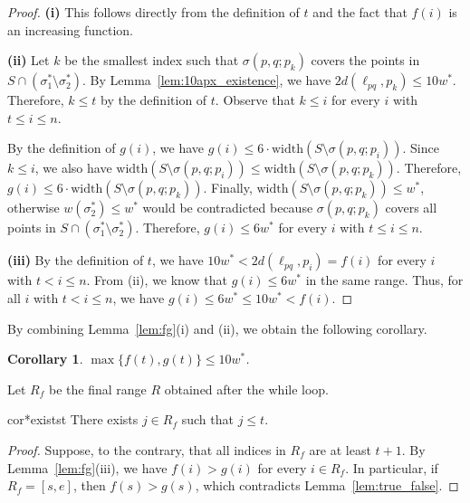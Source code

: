 \documentclass[10pt,a4paper]{article}
\newtheorem{corollary}[theorem]{Corollary}
\theoremstyle{star}
\theoremstyle{claimstar}
\newcommand{\width}{\ensuremath{\mathrm{width}}}
\begin{document}
\begin{proof}
    \textbf{\textsf{(i)}} This follows directly from the definition of $t$ and the fact that $f(i)$ is an increasing function.

    \textbf{\textsf{(ii)}}  Let $k$ be the smallest index such that $\sigma(p, q; p_k)$ covers the points in $S\cap (\sigma_1^* \setminus \sigma_2^*)$. 
    By Lemma~\ref{lem:10apx_existence}, we have $2d(\ell_{pq}, p_k) \le 10w^*$. 
    Therefore, $k\le t$ by the definition of $t$. 
    Observe that $k \le i$ for every $i$ with $t\le i\le n$. 

    By the definition of $g(i)$, we have $g(i) \le 6\cdot \width(S \setminus \sigma(p, q; p_i))$.
    Since $k \le i$, we also have $\width(S\setminus \sigma(p,q;p_{i})) \le \width(S\setminus \sigma(p,q;p_{k})) $.
    Therefore, $g(i) \le 6\cdot \width(S \setminus \sigma(p, q; p_k))$.
    Finally, $\width(S \setminus \sigma(p, q; p_k)) \le w^*$, otherwise $w(\sigma_2^*) \le w^*$ would be contradicted because $\sigma(p, q; p_k)$ covers all points in $S \cap (\sigma_1^* \setminus \sigma_2^*)$.
    Therefore, $g(i) \le 6 w^*$ for every $i$ with $t \le i \le n$.
    
    \textbf{\textsf{(iii)}}  By the definition of $t$, we have  $10w^* < 2d(\ell_{pq}, p_i) = f(i)$ for every $i$ with $t < i \le n$. 
    From {\textsf{(ii)}}, we know that $g(i) \le 6 w^*$ in the same range.
    Thus, for all $i$ with $t < i \le n$, we have $g(i) \le 6w^* \le 10w^* < f(i)$. 
\end{proof}


By combining Lemma~\ref{lem:fg}(i) and (ii), we obtain the following corollary. 


\begin{corollary}
    \label{cor:fgt}
    $\max \{f(t) , g(t)\} \le 10w^*$.
\end{corollary}


Let $R_f$ be the final range $R$ obtained after the while loop. 

\begin{restatable}{cor*}{existst}
    \label{cor:exists_t}
    There exists $j\in R_f$ such that $j \le t$. 
\end{restatable}


\begin{proof}
Suppose, to the contrary, that all indices in $R_f$ are at least $t+1$. 
By Lemma~\ref{lem:fg}(iii), we have $f(i) > g(i)$ for every $i \in R_f$.
In particular, if $R_f = [s, e]$, then $f(s) > g(s)$, which contradicts Lemma~\ref{lem:true_false}.
\end{proof}
\end{document}
